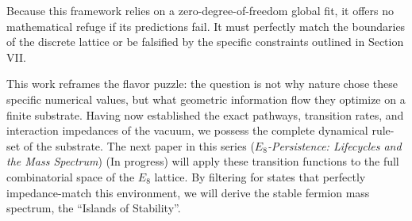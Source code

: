 Because this framework relies on a zero-degree-of-freedom global fit, it offers no mathematical refuge if its predictions fail. It must perfectly match the boundaries of the discrete lattice or be falsified by the specific constraints outlined in Section VII.

This work reframes the flavor puzzle: the question is not why nature chose these specific numerical values, but what geometric information flow they optimize on a finite substrate. Having now established the exact pathways, transition rates, and interaction impedances of the vacuum, we possess the complete dynamical rule-set of the substrate. The next paper in this series (\textit{$E_8$-Persistence: Lifecycles and the Mass Spectrum}) (In progress) will apply these transition functions to the full combinatorial space of the $E_8$ lattice. By filtering for states that perfectly impedance-match this environment, we will derive the stable fermion mass spectrum, the ``Islands of Stability''.
